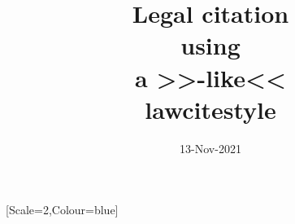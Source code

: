 \newcommand{\printrectangle}{\stepcounter{rectmark}
  \gdef\mynode{pic cs:\therectmark}\tikzmark{\therectmark}%
  \begin{tikzpicture}[remember picture,overlay]
    \fill[blue!10!white] (current page.north west) rectangle 
    ( $ (\mynode) +(\paperwidth,0) $ );
  \end{tikzpicture}
\gdef\mynode{0,0}%
}%



\newcommand\democomm[4][]{%
\cmd{#2}\textcolor{brown}{\braces{#3}}{#4}
\begin{quotation}
#1\csname #2\endcsname{#3}
\end{quotation}
}

\newcommand\democommpost[5][]{%
\cmd{#2}\textcolor{brown}{\brackets{#5}\braces{#3}}{#4}
\begin{quotation}
#1\csname #2\endcsname[#5]{#3}
\end{quotation}
}
%
\newcommand\democommpre[5][]{%
\cmd{#2}\textcolor{brown}{\brackets{#5}\brackets{}\braces{#3}}{#4}
\begin{quotation}
#1\csname #2\endcsname[#5][]{#3}
\end{quotation}
}

\newcommand\democommprepost[6][]{%
\cmd{#2}\textcolor{brown}{\brackets{#5}\brackets{#6}\braces{#3}}{#4}
\begin{quotation}
#1\csname #2\endcsname[#5][#6]{#3}
\end{quotation}
}

\newcommand\vv[1]{\texttt{#1}}

\newsavebox{\mnbox}

\usepackage{tcolorbox}
\newfontface{}[Scale=2,Colour=blue]
\newenvironment{magpar}
{
\begin{tcolorbox}[breakable, enhanced,colback=yellow!10!white,boxrule=0pt,frame hidden,borderline west={1mm}{-2mm}{black}]
{ \fmag 🔍 }
}
{\end{tcolorbox}
 }


\title{Legal citation \\ using \\a >>\textcolor{blue}{\lccurrentstyle}-like<< \\ lawcitestyle}
\author{}
\date{13-Nov-2021}


